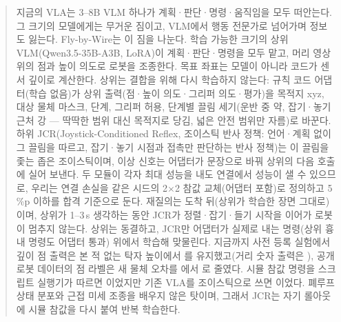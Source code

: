 \begin{abstract}
지금의 VLA는 3--8B VLM 하나가 계획·판단·명령·움직임을 모두 떠안는다. 그 크기의 모델에게는 무거운 짐이고, VLM에서 행동 전문가로 넘어가며 정보도 잃는다. Fly-by-Wire는 이 짐을 나눈다. 학습 가능한 크기의 상위 VLM(Qwen3.5-35B-A3B, LoRA)이 계획·판단·명령을 모두 맡고, 머리 영상 위의 점과 높이 의도로 로봇을 조종한다. 목표 좌표는 모델이 아니라 코드가 센서 깊이로 계산한다. 상위는 결합을 위해 다시 학습하지 않는다: 규칙 코드 어댑터(학습 없음)가 상위 출력(점·높이 의도·그리퍼 의도·평가)을 목적지 xyz, 대상 물체 마스크, 단계, 그리퍼 허용, 단계별 끌림 세기(운반 중 약, 잡기·놓기 근처 강 — 딱딱한 범위 대신 목적지로 당김, 넓은 안전 범위만 자름)로 바꾼다. 하위 JCR(Joystick-Conditioned Reflex, 조이스틱 반사 정책: 언어·계획 없이 그 끌림을 따르고, 잡기·놓기 시점과 접촉만 판단하는 반사 정책)는 이 끌림을 좇는 좁은 조이스틱이며, 이상 신호는 어댑터가 문장으로 바꿔 상위의 다음 호출에 실어 보낸다. 두 모듈이 각자 최대 성능을 내도 연결에서 성능이 샐 수 있으므로, 우리는 연결 손실을 같은 시드의 2$\times$2 참값 교체(어댑터 포함)로 정의하고 5\,\%p 이하를 합격 기준으로 둔다. 재질의는 도착 뒤(상위가 학습한 장면 그대로)이며, 상위가 1--3\,s 생각하는 동안 JCR가 정렬·잡기·들기 시작을 이어가 로봇이 멈추지 않는다. 상위는 동결하고, JCR만 어댑터가 실제로 내는 명령(상위 흉내 명령도 어댑터 통과) 위에서 학습해 맞물린다. 지금까지 사전 등록 실험에서 깊이 점 출력은 본 적 없는 탁자 높이에서 를 유지했고(거리 숫자 출력은 ), 공개 로봇 데이터의 점 라벨은 새 물체 오차를 에서 로 줄였다. 시뮬 참값 명령을 스크립트 실행기가 따르면 이었지만 기존 VLA를 조이스틱으로 쓰면 이었다. 폐루프 상태 분포와 근접 미세 조종을 배우지 않은 탓이며, 그래서 JCR는 자기 롤아웃에 시뮬 참값을 다시 붙여 반복 학습한다.
\end{abstract}
